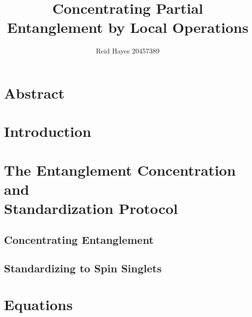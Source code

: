 \documentclass[12pt,letterpaper]{article}
\author{Reid Hayes 20457389}
\title{Concentrating Partial Entanglement by Local Operations}
\begin{document}
\maketitle
\section{Abstract}
\section{Introduction}


\section{The Entanglement Concentration and \\Standardization Protocol}
\subsection{Concentrating Entanglement}
\label{sec:concentrating}


\subsection{Standardizing to Spin Singlets}
\label{sec:standardizing}


\section{Equations}

\printbibliography
\end{document}
